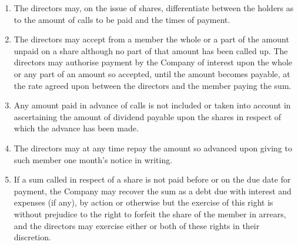 \begin{enumerate}[label=(\alph*)]
    \item The directors may, on the issue of shares, differentiate between the holders as to the amount of calls to be paid and the times of payment.
    
    \item The directors may accept from a member the whole or a part of the amount unpaid on a share although no part of that amount has been called up. The directors may authorise payment by the Company of interest upon the whole or any part of an amount so accepted, until the amount becomes payable, at the rate agreed upon between the directors and the member paying the sum.
    
    \item Any amount paid in advance of calls is not included or taken into account in ascertaining the amount of dividend payable upon the shares in respect of which the advance has been made.
    
    \item The directors may at any time repay the amount so advanced upon giving to such member one month's notice in writing.
    
    \item If a sum called in respect of a share is not paid before or on the due date for payment, the Company may recover the sum as a debt due with interest and expenses (if any), by action or otherwise but the exercise of this right is without prejudice to the right to forfeit the share of the member in arrears, and the directors may exercise either or both of these rights in their discretion.
\end{enumerate} 